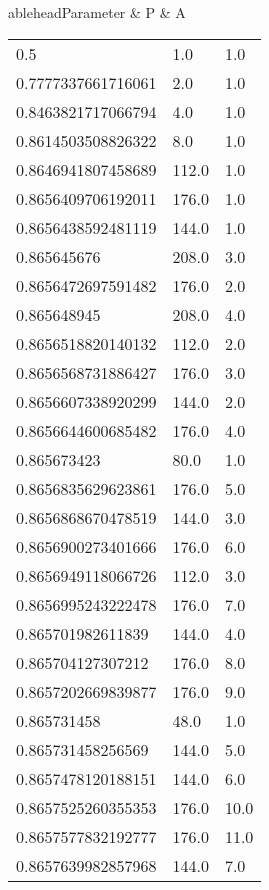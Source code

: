 \begin{center}
\twocolumn
{}
	ablehead{Parameter & P & A \\}
\tabletail{%
}
\tablelasttail{\hline}
\begin{supertabular}[H]{p{0.30\textwidth}p{0.05\textwidth}p{0.05\textwidth}}
0.5 & 1.0 & 1.0 \\ 
0.7777337661716061 & 2.0 & 1.0 \\ 
0.8463821717066794 & 4.0 & 1.0 \\ 
0.8614503508826322 & 8.0 & 1.0 \\ 
0.8646941807458689 & 112.0 & 1.0 \\ 
0.8656409706192011 & 176.0 & 1.0 \\ 
0.8656438592481119 & 144.0 & 1.0 \\ 
0.865645676 & 208.0 & 3.0 \\ 
0.8656472697591482 & 176.0 & 2.0 \\ 
0.865648945 & 208.0 & 4.0 \\ 
0.8656518820140132 & 112.0 & 2.0 \\ 
0.8656568731886427 & 176.0 & 3.0 \\ 
0.8656607338920299 & 144.0 & 2.0 \\ 
0.8656644600685482 & 176.0 & 4.0 \\ 
0.865673423 & 80.0 & 1.0 \\ 
0.8656835629623861 & 176.0 & 5.0 \\ 
0.8656868670478519 & 144.0 & 3.0 \\ 
0.8656900273401666 & 176.0 & 6.0 \\ 
0.8656949118066726 & 112.0 & 3.0 \\ 
0.8656995243222478 & 176.0 & 7.0 \\ 
0.865701982611839 & 144.0 & 4.0 \\ 
0.865704127307212 & 176.0 & 8.0 \\ 
0.8657202669839877 & 176.0 & 9.0 \\ 
0.865731458 & 48.0 & 1.0 \\ 
0.865731458256569 & 144.0 & 5.0 \\ 
0.8657478120188151 & 144.0 & 6.0 \\ 
0.8657525260355353 & 176.0 & 10.0 \\ 
0.8657577832192777 & 176.0 & 11.0 \\ 
0.8657639982857968 & 144.0 & 7.0 \\ 

\end{supertabular}
\end{center}
